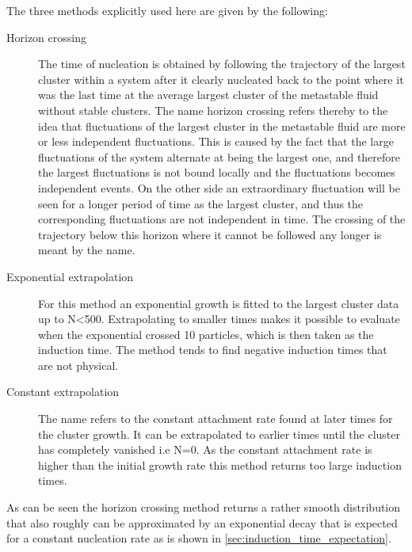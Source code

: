 The three methods explicitly used here are given by the following:
\begin{description}
\item[Horizon crossing]{The time of nucleation is obtained by following the trajectory of the largest cluster within a system after it clearly nucleated back to the point where it was the last time at the average largest cluster of the metastable fluid without stable clusters. The name horizon crossing refers thereby to the idea that fluctuations of the largest cluster in the metastable fluid are more or less independent fluctuations. This is caused by the fact that the large fluctuations of the system alternate at being the largest one, and therefore the largest fluctuations is not bound locally and the fluctuations becomes independent events. On the other side an extraordinary fluctuation will be seen for a longer period of time as the largest cluster, and thus the corresponding fluctuations are not independent in time. The crossing of the trajectory below this horizon where it cannot be followed any longer is meant by the name.}

\item[Exponential extrapolation]{For this method an exponential growth is fitted to the largest cluster data up to N<500. Extrapolating to smaller times makes it possible to evaluate when the exponential crossed 10 particles, which is then taken as the induction time. The method tends to find negative induction times that are not physical.}

\item[Constant extrapolation]{The name refers to the constant attachment rate found at later times for the cluster growth. It can be extrapolated to earlier times until the cluster has completely vanished i.e N=0. As the constant attachment rate is higher than the initial growth rate this method returns too large induction times.}
\end{description}

As can be seen the horizon crossing method returns a rather smooth distribution that also roughly can be approximated by an exponential decay that is expected for a constant nucleation rate as is shown in \autoref{sec:induction_time_expectation}.\\


